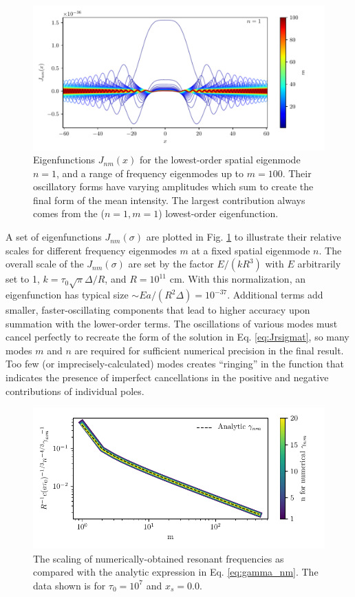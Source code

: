 \documentclass{aastex63}
\begin{document}
\begin{figure}
    \centering
    \includegraphics{Jsoln_n1_m100.pdf}
    \caption{Eigenfunctions $J_{nm}(x)$ for the lowest-order spatial eigenmode $n=1$, and a range of frequency eigenmodes up to $m=100$. Their oscillatory forms have varying amplitudes which sum to create the final form of the mean intensity. The largest contribution always comes from the ($n=1, m=1$) lowest-order eigenfunction.}
    \label{fig:jsoln}
\end{figure}
A set of eigenfunctions $J_{nm}(\sigma)$ are plotted in Fig. \ref{fig:jsoln} to illustrate their relative scales for different frequency eigenmodes $m$ at a fixed spatial eigenmode $n$. The overall scale of the $J_{nm}(\sigma)$ are set by the factor $E/(kR^3)$ with $E$ arbitrarily set to 1, $k = \tau_0 \sqrt{\pi} \Delta / R$, and $R = 10^{11}$ cm. With this normalization, an eigenfunction has typical size ${\sim} E a / \left(R^2 \Delta \right) = 10^{-37}$. Additional terms add smaller, faster-oscillating components that lead to higher accuracy upon summation with the lower-order terms. The oscillations of various modes must cancel perfectly to recreate the form of the solution in Eq. \ref{eq:Jrsigmat}, so many modes $m$ and $n$ are required for sufficient numerical precision in the final result. Too few (or imprecisely-calculated) modes creates ``ringing'' in the function that indicates the presence of imperfect cancellations in the positive and negative contributions of individual poles. 
\begin{figure}
    \centering
    \includegraphics[width=\textwidth]{gamma_nm.pdf}
    \caption{The scaling of numerically-obtained resonant frequencies as compared with the analytic expression in Eq. \ref{eq:gamma_nm}. The data shown is for $\tau_0=10^7$ and $x_s=0.0$.}
    \label{fig:gamma_nm}
\end{figure}
\end{document}
